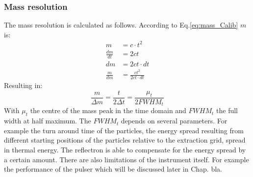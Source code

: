 	\subsubsection{Mass resolution} %
	The mass resolution is calculated as follows. According to Eq.\ref{eq:mass_Calib} $m$ is:
	\begin{align*}
		m &= c\cdot t^2\\
		\frac{dm}{dt} &= 2ct\\
		dm &= 2ct\cdot dt\\
		\frac{m}{dm} &= \frac{ct^2}{2ct\cdot dt}
	\end{align*}
	Resulting in:
	\begin{equation}
		\frac{m}{\Delta m} = \frac{t}{2 \Delta t} = \frac{\mu_t}{2 FWHM_t}
		\label{eq:mass_res}
	\end{equation}
	With $\mu_t$ the centre of the mass peak in the time domain and $FWHM_t$ the full width at half maximum. The $FWHM_t$ depends on several parameters. For example the turn around time of the particles, the energy spread resulting from different starting positions of the particles relative to the extraction grid, spread in thermal energy. The reflectron is able to compensate for the energy spread by a certain amount. %
	There are also limitations of the instrument itself. For example the performance of the pulser which will be discussed later in Chap. bla.

	
	
